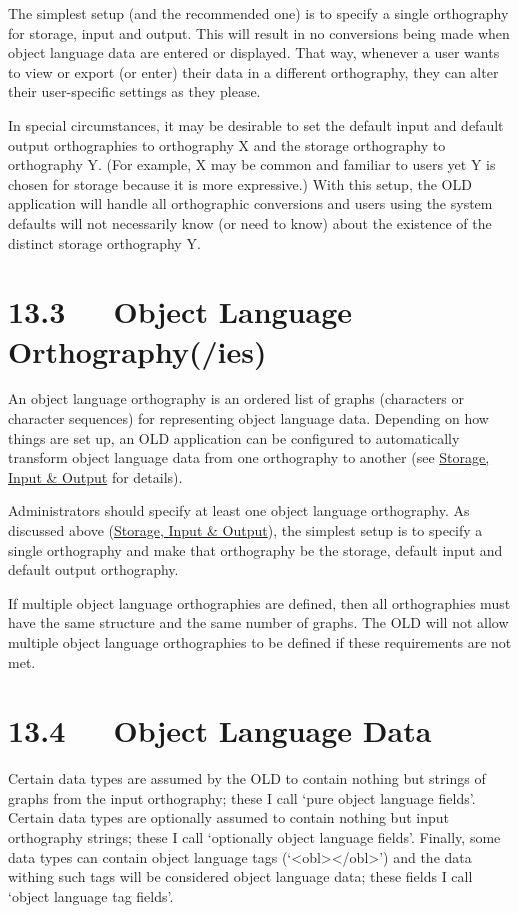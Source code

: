 \documentclass[letterpaper,10pt,english]{sphinxmanual}
\begin{document}
The simplest setup (and the recommended one) is to specify a single orthography
for storage, input and output.  This will result in no conversions being made
when object language data are entered or displayed.  That way, whenever a user
wants to view or export (or enter) their data in a different orthography, they
can alter their user-specific settings as they please.

In special circumstances, it may be desirable to set the default input and
default output orthographies to orthography X and the storage orthography to
orthography Y.  (For example, X may be common and familiar to users yet Y is
chosen for storage because it is more expressive.)  With this setup, the OLD
application will handle all orthographic conversions and users using the
system defaults will not necessarily know (or need to know) about the existence
of the distinct storage orthography Y.


\section{13.3   Object Language Orthography(/ies)}
\label{user_guide:object-language-orthography-ies}
An object language orthography is an ordered list of graphs (characters or
character sequences) for representing object language data.  Depending on how
things are set up, an OLD application can be configured to automatically
transform object language data from one orthography to another (see
{\hyperref[user_guide:storage-input-output]{Storage, Input \& Output}} for details).

Administrators should specify at least one object language orthography.  As
discussed above ({\hyperref[user_guide:storage-input-output]{Storage, Input \& Output}}), the simplest setup is to specify
a single orthography and make that orthography be the storage, default input and
default output orthography.

If multiple object language orthographies are defined, then all orthographies
must have the same structure and the same number of graphs.  The OLD will not
allow multiple object language orthographies to be defined if these requirements
are not met.


\section{13.4   Object Language Data}
\label{user_guide:object-language-data}
Certain data types are assumed by the OLD to contain nothing but strings of
graphs from the input orthography; these I call `pure object language fields'.
Certain data types are optionally assumed to contain nothing but input
orthography strings; these I call `optionally object language fields'.  Finally,
some data types can contain object language tags (`\textless{}obl\textgreater{}\textless{}/obl\textgreater{}') and the data
withing such tags will be considered object language data; these fields I call
`object language tag fields'.
\end{document}

